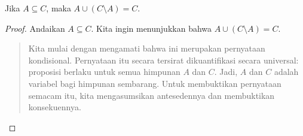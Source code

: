\documentclass[../../../include/open-logic-section]{subfiles}
\begin{document}


\begin{prop}
Jika $A \subseteq C$, maka $A \cup (C \setminus A) = C$.
\end{prop}

\begin{proof}
  Andaikan $A \subseteq C$. Kita ingin menunjukkan bahwa $A \cup (C
  \setminus A) = C$.
  \begin{quote}
    Kita mulai dengan mengamati bahwa ini merupakan pernyataan
    kondisional. Pernyataan itu secara tersirat dikuantifikasi secara
    universal: proposisi berlaku untuk semua himpunan $A$ dan $C$.
    Jadi, $A$ dan $C$ adalah variabel bagi himpunan sembarang. Untuk
    membuktikan pernyataan semacam itu, kita mengasumsikan antesedennya
    dan membuktikan konsekuennya.


\end{quote}
\end{proof}
\end{document}
